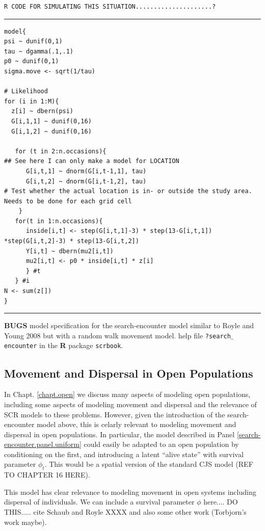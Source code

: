 \begin{verbatim}
R CODE FOR SIMULATING THIS SITUATION.....................?
\end{verbatim}



\begin{panel}[htp]
\centering
\rule[0.15in]{\textwidth}{.03in}
{\small
\begin{verbatim}
model{
psi ~ dunif(0,1)
tau ~ dgamma(.1,.1)
p0 ~ dunif(0,1)
sigma.move <- sqrt(1/tau)

# Likelihood
for (i in 1:M){
  z[i] ~ dbern(psi)
  G[i,1,1] ~ dunif(0,16)
  G[i,1,2] ~ dunif(0,16)

   for (t in 2:n.occasions){
## See here I can only make a model for LOCATION
      G[i,t,1] ~ dnorm(G[i,t-1,1], tau)
      G[i,t,2] ~ dnorm(G[i,t-1,2], tau)
# Test whether the actual location is in- or outside the study area. Needs to be done for each grid cell
    }
   for(t in 1:n.occasions){
      inside[i,t] <- step(G[i,t,1]-3) * step(13-G[i,t,1]) *step(G[i,t,2]-3) * step(13-G[i,t,2])
      Y[i,t] ~ dbern(mu2[i,t])
      mu2[i,t] <- p0 * inside[i,t] * z[i]
      } #t
   } #i
N <- sum(z[])
}
\end{verbatim}
}
\rule[-0.15in]{\textwidth}{.03in}
\caption{
{\bf BUGS} model specification for the search-encounter model similar
to Royle and Young 2008 but with a random walk movement model.
help file \mbox{\tt ?search$\_$encounter} in the {\bf R} package \mbox{\tt scrbook}.
}
\label{search-encounter.panel.uniform}
\end{panel}

\subsection{Movement and Dispersal in Open Populations}

In Chapt. \ref{chapt.open} we discuss many aspects of modeling open
populations, including some aspects of modeling movement and dispersal
and the relevance of SCR models to these problems. However, given the
introduction of the search-encounter model above, this is celarly
relevant to modeling movement and dispersal in open populations.
In particular, the model described in Panel
\ref{search-encounter.panel.uniform} could easily be adapted to an
open population by conditioning on the first, and introducing a latent
``alive state'' with survival parameter $\phi_{t}$. This would be a
spatial version of the standard CJS model (REF TO CHAPTER 16 HERE).

This model has clear relevance to modeling movement in open systems
including dispersal of individuals. We can include a survival
parameter $\phi$ here.... DO THIS..... cite Schaub and Royle XXXX and
also some other work (Torbjorn's work maybe).

